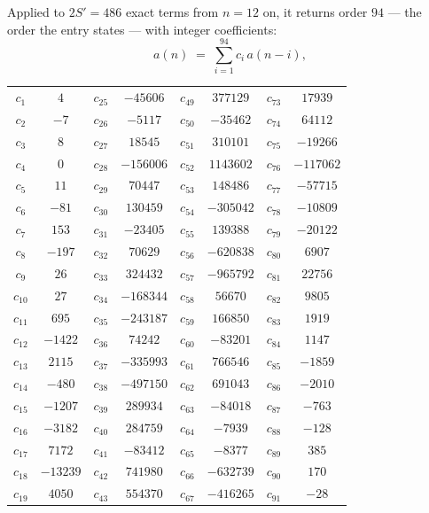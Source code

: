 \documentclass[11pt,a4paper]{article}
\theoremstyle{plain}
\theoremstyle{definition}
\begin{document}
Applied to $2S'=486$ exact terms from $n=12$ on, it returns order $94$ --- the
order the entry states --- with integer coefficients:
\[
a(n)\;=\;\sum_{i=1}^{94}c_i\,a(n-i),
\]
\begin{center}\small
\begin{tabular}{cccccccc}
$c_{1}$ & $4$ & $c_{25}$ & $-45606$ & $c_{49}$ & $377129$ & $c_{73}$ & $17939$ \\
$c_{2}$ & $-7$ & $c_{26}$ & $-5117$ & $c_{50}$ & $-35462$ & $c_{74}$ & $64112$ \\
$c_{3}$ & $8$ & $c_{27}$ & $18545$ & $c_{51}$ & $310101$ & $c_{75}$ & $-19266$ \\
$c_{4}$ & $0$ & $c_{28}$ & $-156006$ & $c_{52}$ & $1143602$ & $c_{76}$ & $-117062$ \\
$c_{5}$ & $11$ & $c_{29}$ & $70447$ & $c_{53}$ & $148486$ & $c_{77}$ & $-57715$ \\
$c_{6}$ & $-81$ & $c_{30}$ & $130459$ & $c_{54}$ & $-305042$ & $c_{78}$ & $-10809$ \\
$c_{7}$ & $153$ & $c_{31}$ & $-23405$ & $c_{55}$ & $139388$ & $c_{79}$ & $-20122$ \\
$c_{8}$ & $-197$ & $c_{32}$ & $70629$ & $c_{56}$ & $-620838$ & $c_{80}$ & $6907$ \\
$c_{9}$ & $26$ & $c_{33}$ & $324432$ & $c_{57}$ & $-965792$ & $c_{81}$ & $22756$ \\
$c_{10}$ & $27$ & $c_{34}$ & $-168344$ & $c_{58}$ & $56670$ & $c_{82}$ & $9805$ \\
$c_{11}$ & $695$ & $c_{35}$ & $-243187$ & $c_{59}$ & $166850$ & $c_{83}$ & $1919$ \\
$c_{12}$ & $-1422$ & $c_{36}$ & $74242$ & $c_{60}$ & $-83201$ & $c_{84}$ & $1147$ \\
$c_{13}$ & $2115$ & $c_{37}$ & $-335993$ & $c_{61}$ & $766546$ & $c_{85}$ & $-1859$ \\
$c_{14}$ & $-480$ & $c_{38}$ & $-497150$ & $c_{62}$ & $691043$ & $c_{86}$ & $-2010$ \\
$c_{15}$ & $-1207$ & $c_{39}$ & $289934$ & $c_{63}$ & $-84018$ & $c_{87}$ & $-763$ \\
$c_{16}$ & $-3182$ & $c_{40}$ & $284759$ & $c_{64}$ & $-7939$ & $c_{88}$ & $-128$ \\
$c_{17}$ & $7172$ & $c_{41}$ & $-83412$ & $c_{65}$ & $-8377$ & $c_{89}$ & $385$ \\
$c_{18}$ & $-13239$ & $c_{42}$ & $741980$ & $c_{66}$ & $-632739$ & $c_{90}$ & $170$ \\
$c_{19}$ & $4050$ & $c_{43}$ & $554370$ & $c_{67}$ & $-416265$ & $c_{91}$ & $-28$ \\

\end{tabular}
\end{center}
\end{document}
